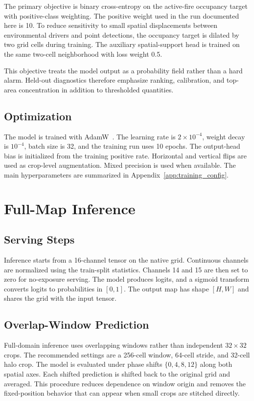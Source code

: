 \documentclass[11pt]{article}
\begin{document}
The primary objective is binary cross-entropy on the active-fire occupancy target with positive-class weighting.
The positive weight used in the run documented here is 10.
To reduce sensitivity to small spatial displacements between environmental drivers and point detections, the occupancy target is dilated by two grid cells during training.
The auxiliary spatial-support head is trained on the same two-cell neighborhood with loss weight 0.5.

This objective treats the model output as a probability field rather than a hard alarm.
Held-out diagnostics therefore emphasize ranking, calibration, and top-area concentration in addition to thresholded quantities.

\subsection{Optimization}

The model is trained with AdamW~\cite{loshchilov2019adamw}.
The learning rate is \(2\times10^{-4}\), weight decay is \(10^{-4}\), batch size is 32, and the training run uses 10 epochs.
The output-head bias is initialized from the training positive rate.
Horizontal and vertical flips are used as crop-level augmentation.
Mixed precision is used when available.
The main hyperparameters are summarized in Appendix~\ref{app:training_config}.

\section{Full-Map Inference}
\label{sec:inference}

\subsection{Serving Steps}

Inference starts from a 16-channel tensor on the native grid.
Continuous channels are normalized using the train-split statistics.
Channels 14 and 15 are then set to zero for no-exposure serving.
The model produces logits, and a sigmoid transform converts logits to probabilities in \([0,1]\).
The output map has shape \([H,W]\) and shares the grid with the input tensor.

\subsection{Overlap-Window Prediction}

Full-domain inference uses overlapping windows rather than independent \(32\times32\) crops.
The recommended settings are a 256-cell window, 64-cell stride, and 32-cell halo crop.
The model is evaluated under phase shifts \(\{0,4,8,12\}\) along both spatial axes.
Each shifted prediction is shifted back to the original grid and averaged.
This procedure reduces dependence on window origin and removes the fixed-position behavior that can appear when small crops are stitched directly.
\end{document}
